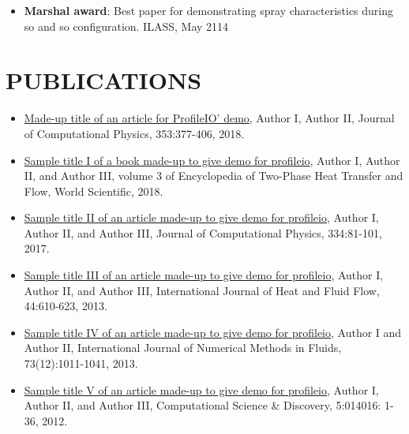 \documentclass{res}
\begin{document}
\begin{resume}
\begin{itemize}[leftmargin=\parindent]
		\item[] {\bf Marshal award}:  Best paper for demonstrating spray characteristics during so and so configuration. ILASS, May 2114
	\end{itemize}
	
	
	
	\section{\MakeUppercase{Publications}} \vskip 0.35in
	\begin{itemize}[leftmargin=\parindent]
	\setlength{\itemsep}{4pt}
	
	\item[] \href{https://www.sciencedirect.com/science/article/pii/S0021999117307696}{Made-up title of an article for ProfileIO' demo}, Author I, Author II, Journal of Computational Physics, 353:377-406, 2018.
	\item[] \href{https://www.worldscientific.com/doi/abs/10.1142/9789813229440_0008}{Sample title I of a book made-up to give demo for profileio}, Author I, Author II, and Author III, volume 3 of Encyclopedia of Two-Phase Heat Transfer and Flow, World Scientific, 2018.
	\item[] \href{https://www.sciencedirect.com/science/article/pii/S0021999116307045}{Sample title II of an article made-up to give demo for profileio}, Author I, Author II, and Author III, Journal of Computational Physics, 334:81-101, 2017.
	\item[] \href{https://www.sciencedirect.com/science/article/pii/S0142727X13001707}{Sample title III of an article made-up to give demo for profileio}, Author I, Author II, and Author III, International Journal of Heat and Fluid Flow, 44:610-623, 2013.
	\item[] \href{http://onlinelibrary.wiley.com/doi/10.1002/fld.3834/abstract}{Sample title IV of an article made-up to give demo for profileio}, Author I and Author II, International Journal of Numerical Methods in Fluids, 73(12):1011-1041, 2013.
	\item[] \href{http://iopscience.iop.org/1749-4699/5/1/014016}{Sample title V of an article made-up to give demo for profileio}, Author I, Author II, and Author III, Computational Science \& Discovery, 5:014016: 1-36, 2012.
	\end{itemize}
	

\end{resume}
\end{document}
